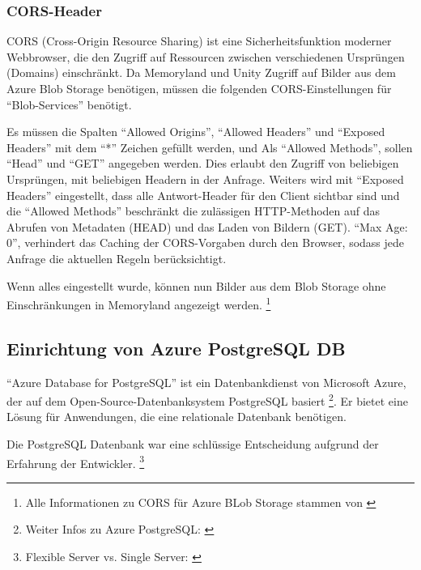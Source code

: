 \subsubsection{CORS-Header}

CORS (Cross-Origin Resource Sharing) ist eine Sicherheitsfunktion moderner Webbrowser, 
die den Zugriff auf Ressourcen zwischen verschiedenen Ursprüngen (Domains) einschränkt.
Da Memoryland und Unity Zugriff auf Bilder aus dem Azure Blob Storage benötigen, müssen
die folgenden CORS-Einstellungen für ``Blob-Services'' benötigt.

Es müssen die Spalten ``Allowed Origins'', ``Allowed Headers'' und ``Exposed Headers''
mit dem ``*'' Zeichen gefüllt werden, und Als ``Allowed Methods'', sollen ``Head'' und
``GET'' angegeben werden. Dies erlaubt den Zugriff von beliebigen Ursprüngen, mit beliebigen
Headern in der Anfrage. Weiters wird mit ``Exposed Headers'' eingestellt, dass alle 
Antwort-Header für den Client sichtbar sind und die ``Allowed Methods'' beschränkt die 
zulässigen HTTP-Methoden auf das Abrufen von Metadaten (HEAD) und das 
Laden von Bildern (GET). ``Max Age: 0'', verhindert das Caching der CORS-Vorgaben 
durch den Browser, sodass jede Anfrage die aktuellen Regeln berücksichtigt.

Wenn alles eingestellt wurde, können nun Bilder aus dem Blob Storage ohne Einschränkungen 
in Memoryland angezeigt werden. \footnote{Alle Informationen zu CORS für Azure BLob Storage stammen von \cite{MicrosoftCorporationc}}


\subsection{Einrichtung von Azure PostgreSQL DB}

``Azure Database for PostgreSQL'' ist ein Datenbankdienst von Microsoft Azure, 
der auf dem Open-Source-Datenbanksystem PostgreSQL basiert \footnote{Weiter Infos zu Azure PostgreSQL: \cite{MicrosoftCorporationf}}. 
Er bietet eine Lösung für Anwendungen, die eine relationale Datenbank benötigen.

Die PostgreSQL Datenbank war eine schlüssige Entscheidung aufgrund der Erfahrung der Entwickler.
\footnote{Flexible Server vs. Single Server: \cite{MicrosoftCorporatione}}

